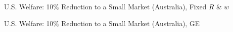\documentclass[9pt,pdftex,aspectratio=1610]{beamer}
\theoremstyle{definition}
\begin{document}
\begin{frame}[t]{U.S. Welfare: 10\% Reduction to a Small Market (Australia), {\color{red} Fixed $R$ \& $w$} }
\vspace{-.5cm}
\begin{figure}[!t]
\end{figure}
\end{frame}

\begin{frame}[t]{U.S. Welfare: 10\% Reduction to a Small Market (Australia), {\color{red} GE} }
\vspace{-.5cm}
\begin{figure}[!t]
\end{figure}
\end{frame}
\end{document}

